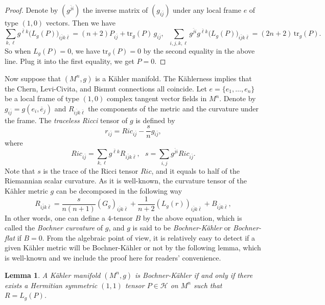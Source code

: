 \documentclass{amsart}
\newtheorem{lemma}{Lemma}
\numberwithin{equation}{section}
\begin{document}
\begin{proof}
Denote by $(g^{\bar{j}i})$ the inverse matrix of $(g_{i\bar{j}})$ under any local frame $e$ of type $(1,0)$ vectors. Then we have
$$ \sum_{k,\ell} g^{\bar{\ell}k} \big(L_g(P)\big)_{i\bar{j}k\bar{\ell}} = (n+2)P_{i\bar{j}} + \mbox{tr}_g(P)\,g_{i\bar{j}}, \ \ \,  \sum_{i,j,k,\ell} g^{\bar{j}i}g^{\bar{\ell}k} \big(L_g(P)\big)_{i\bar{j}k\bar{\ell}} = (2n+2)\,\mbox{tr}_g(P).$$
So when $L_g(P)=0$, we have $\mbox{tr}_g(P)=0$ by the second equality in the above line. Plug it into the first equality, we get $P=0$.
\end{proof}



Now suppose that $(M^n,g)$ is a K\"ahler manifold. The K\"ahlerness implies that the Chern, Levi-Civita, and Bismut connections all coincide.
Let $e=\{ e_1, \ldots , e_n\}$ be a local frame of type $(1,0)$ complex tangent vector fields in $M^n$. Denote by $g_{i\bar{j}}=g(e_i, \overline{e}_j)$ and $R_{i\bar{j}k\bar{\ell}}$ the components of the metric and the curvature under the frame. The {\em traceless Ricci} tensor of $g$ is defined by
$$  r_{i\bar{j}} = Ric_{i\bar{j}} - \frac{s}{n}g_{i\bar{j}}, $$
where
$$ Ric_{i\bar{j}} = \sum_{k,\ell} g^{\bar{\ell }k} R_{i\bar{j}k\bar{\ell}}, \ \ \ s=\sum_{i,j} g^{\bar{j}i} Ric_{i\bar{j}}. $$
Note that $s$ is the trace of the Ricci tensor $Ric$, and it equals to half of the Riemannian scalar curvature.
As it is well-known, the curvature tensor of the K\"ahler metric $g$ can be decomposed in the following way
\begin{equation} \label{eq:decom}
R_{i\bar{j}k\bar{\ell}} =  \frac{s}{n(n+1)} (G_g)_{i\bar{j}k\bar{\ell}} + \frac{1}{n+2} (L_g(r))_{i\bar{j}k\bar{\ell}} + B_{i\bar{j}k\bar{\ell}} ,
\end{equation}
In other words, one can define a $4$-tensor $B$ by the above equation, which is called the {\em Bochner curvature} of $g$, and $g$ is said to be {\em Bochner-K\"ahler} or {\em Bochner-flat} if $B=0$. From the algebraic point of view, it is relatively easy to detect if a given K\"ahler metric will be Bochner-K\"ahler or not by the following lemma, which is  well-known and we include the proof here for readers' convenience.

\begin{lemma} \label{lemma3}
A K\"ahler manifold $(M^n,g)$ is Bochner-K\"ahler if and only if there exists a Hermitian symmetric $(1,1)$ tensor $P\in {\mathcal H}$ on $M^n$ such that $R=L_g(P)$.
\end{lemma}
\end{document}
